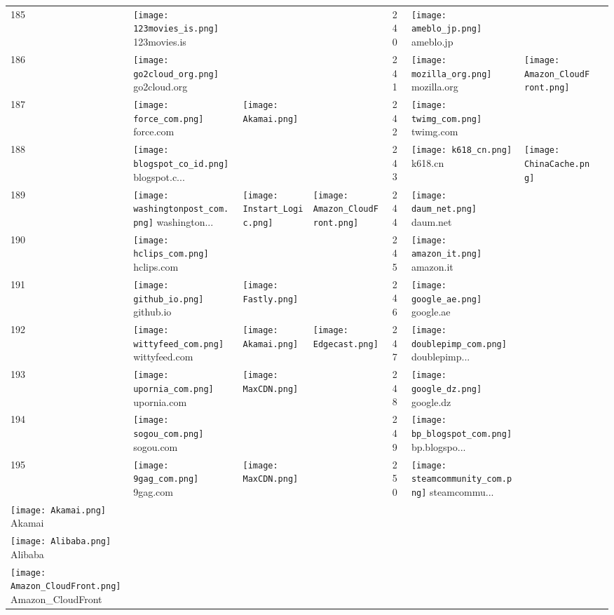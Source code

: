 \begin{table}[]
\begin{tabular}{|llll|llll|}
185 & \texttt{[image: 123movies\_is.png]} 123movies.is & & & 240 & \texttt{[image: ameblo\_jp.png]} ameblo.jp & & \\
186 & \texttt{[image: go2cloud\_org.png]} go2cloud.org & & & 241 & \texttt{[image: mozilla\_org.png]} mozilla.org & \texttt{[image: Amazon\_CloudFront.png]} & \\
187 & \texttt{[image: force\_com.png]} force.com & \texttt{[image: Akamai.png]} & & 242 & \texttt{[image: twimg\_com.png]} twimg.com & & \\
188 & \texttt{[image: blogspot\_co\_id.png]} blogspot.c... & & & 243 & \texttt{[image: k618\_cn.png]} k618.cn & \texttt{[image: ChinaCache.png]} & \\
189 & \texttt{[image: washingtonpost\_com.png]} washington... & \texttt{[image: Instart\_Logic.png]} & \texttt{[image: Amazon\_CloudFront.png]} & 244 & \texttt{[image: daum\_net.png]} daum.net & & \\
190 & \texttt{[image: hclips\_com.png]} hclips.com & & & 245 & \texttt{[image: amazon\_it.png]} amazon.it & & \\
191 & \texttt{[image: github\_io.png]} github.io & \texttt{[image: Fastly.png]} & & 246 & \texttt{[image: google\_ae.png]} google.ae & & \\
192 & \texttt{[image: wittyfeed\_com.png]} wittyfeed.com & \texttt{[image: Akamai.png]} & \texttt{[image: Edgecast.png]} & 247 & \texttt{[image: doublepimp\_com.png]} doublepimp... & & \\
193 & \texttt{[image: upornia\_com.png]} upornia.com & \texttt{[image: MaxCDN.png]} & & 248 & \texttt{[image: google\_dz.png]} google.dz & & \\
194 & \texttt{[image: sogou\_com.png]} sogou.com & & & 249 & \texttt{[image: bp\_blogspot\_com.png]} bp.blogspo... & & \\
195 & \texttt{[image: 9gag\_com.png]} 9gag.com & \texttt{[image: MaxCDN.png]} & & 250 & \texttt{[image: steamcommunity\_com.png]} steamcommu... & & \\
\hline
\texttt{[image: Akamai.png]} Akamai \\
\texttt{[image: Alibaba.png]} Alibaba \\
\texttt{[image: Amazon\_CloudFront.png]} Amazon_CloudFront \\

\end{tabular}
\end{table}
